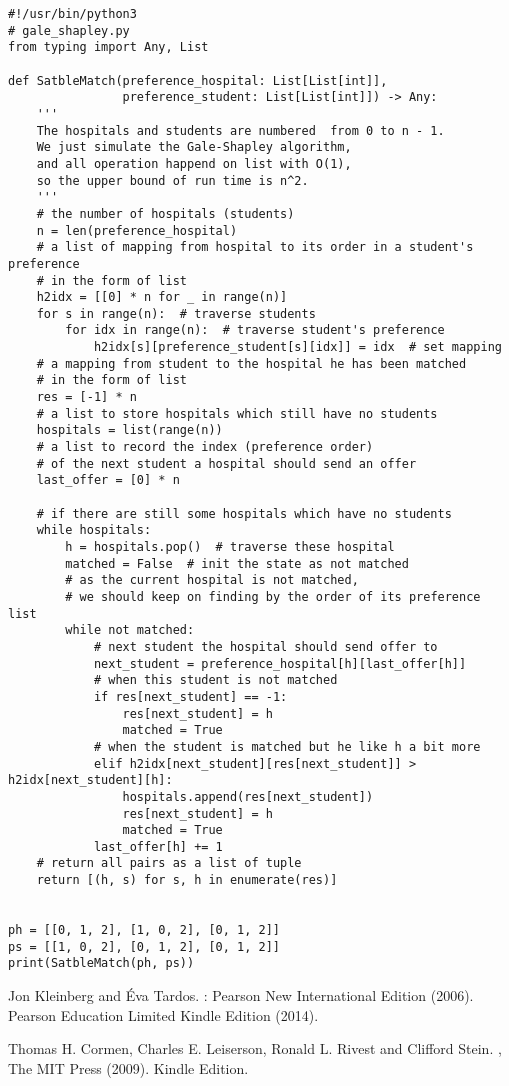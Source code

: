 \documentclass[11pt,letterpaper]{article}
\begin{document}
\begin{verbatim}
#!/usr/bin/python3
# gale_shapley.py
from typing import Any, List

def SatbleMatch(preference_hospital: List[List[int]], 
                preference_student: List[List[int]]) -> Any:
    '''
    The hospitals and students are numbered  from 0 to n - 1.
    We just simulate the Gale-Shapley algorithm,
    and all operation happend on list with O(1),
    so the upper bound of run time is n^2.
    '''
    # the number of hospitals (students)
    n = len(preference_hospital)
    # a list of mapping from hospital to its order in a student's preference
    # in the form of list
    h2idx = [[0] * n for _ in range(n)]
    for s in range(n):  # traverse students
        for idx in range(n):  # traverse student's preference
            h2idx[s][preference_student[s][idx]] = idx  # set mapping
    # a mapping from student to the hospital he has been matched
    # in the form of list
    res = [-1] * n
    # a list to store hospitals which still have no students
    hospitals = list(range(n))
    # a list to record the index (preference order) 
    # of the next student a hospital should send an offer
    last_offer = [0] * n

    # if there are still some hospitals which have no students
    while hospitals:
        h = hospitals.pop()  # traverse these hospital
        matched = False  # init the state as not matched
        # as the current hospital is not matched, 
        # we should keep on finding by the order of its preference list
        while not matched:
            # next student the hospital should send offer to
            next_student = preference_hospital[h][last_offer[h]]
            # when this student is not matched
            if res[next_student] == -1:
                res[next_student] = h
                matched = True
            # when the student is matched but he like h a bit more
            elif h2idx[next_student][res[next_student]] > h2idx[next_student][h]:
                hospitals.append(res[next_student])
                res[next_student] = h
                matched = True
            last_offer[h] += 1
    # return all pairs as a list of tuple
    return [(h, s) for s, h in enumerate(res)]


ph = [[0, 1, 2], [1, 0, 2], [0, 1, 2]]
ps = [[1, 0, 2], [0, 1, 2], [0, 1, 2]]
print(SatbleMatch(ph, ps))
\end{verbatim}


\begin{thebibliography}{11}

	Jon Kleinberg and Éva Tardos.
	: Pearson New International Edition (2006).
	\newblock Pearson Education Limited Kindle Edition (2014). 
	
	Thomas H. Cormen, Charles E. Leiserson, Ronald L. Rivest and Clifford Stein.
	, The MIT Press (2009).
	\newblock Kindle Edition. 
	
\end{thebibliography}
\end{document}
